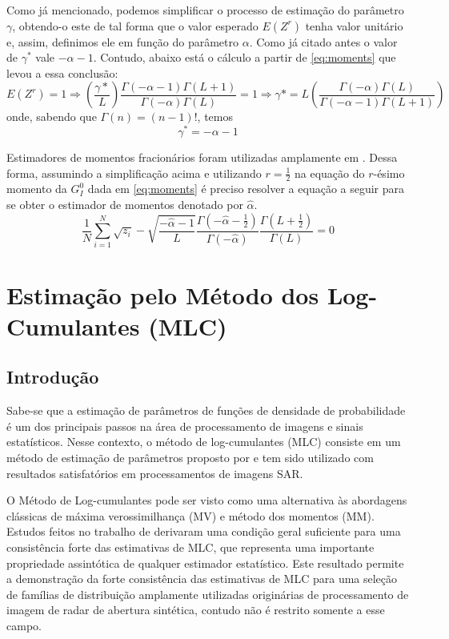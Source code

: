 Como já mencionado, podemos simplificar o processo de estimação do parâmetro $\gamma$, obtendo-o este de tal forma que o valor esperado $E(Z^r)$ tenha valor unitário e, assim, definimos ele em função do parâmetro $\alpha$. Como já citado antes o valor de $\gamma^{*}$ vale $-\alpha - 1$. Contudo, abaixo está o cálculo a partir de \eqref{eq:moments} que levou a essa conclusão:
\begin{equation}
    E(Z^r) = 1 \Rightarrow \left (\frac{\gamma*}{L}\right ) \frac{\Gamma(-\alpha-1)\Gamma(L+1)}{\Gamma(-\alpha)\Gamma(L)} = 1 \Rightarrow \gamma* = L\left ( \frac{\Gamma(-\alpha)\Gamma(L)}{\Gamma(-\alpha-1)\Gamma(L+1)} \right ) 
\end{equation}
onde, sabendo que $\Gamma(n) = (n-1)!$, temos
\begin{equation}
    \gamma^{*} = -\alpha - 1
\end{equation}

Estimadores de momentos fracionários foram utilizadas amplamente em \citet{Clutter1997}. Dessa forma, assumindo a simplificação acima e utilizando $r=\frac{1}{2}$ na equação do $r$-ésimo momento da $G_I^0$ dada em \eqref{eq:moments} é preciso resolver a equação a seguir para se obter o estimador de momentos denotado por $\widehat{\alpha}$.
\begin{equation}
    \frac{1}{N}\sum_{i=1}^{N}\sqrt{z_i}-\sqrt{\frac{-\widehat{\alpha} - 1}{L}}\frac{\Gamma(-\widehat{\alpha} - \frac{1}{2})}{\Gamma(-\widehat{\alpha})}\frac{\Gamma(L+\frac{1}{2})}{\Gamma(L)} = 0 \label{fractional_moments}
\end{equation} 

\section{Estimação pelo Método dos Log-Cumulantes (MLC)}

\subsection{Introdução}

Sabe-se que a estimação de parâmetros de funções de densidade de probabilidade é um dos principais passos na área de processamento de imagens e sinais estatísticos. Nesse contexto, o método de log-cumulantes (MLC) consiste em um método de estimação de parâmetros proposto por \citet{nicolas2002} e tem sido utilizado com resultados satisfatórios em processamentos de imagens SAR.

O Método de Log-cumulantes pode ser visto como uma alternativa às abordagens clássicas de máxima verossimilhança (MV) e método dos momentos (MM). Estudos feitos no trabalho de \citet{krylov2013} derivaram uma condição geral suficiente para uma consistência forte das estimativas de MLC, que representa uma importante propriedade assintótica de qualquer estimador estatístico. Este resultado permite a demonstração da forte consistência das estimativas de MLC para uma seleção de famílias de distribuição amplamente utilizadas originárias de processamento de imagem de radar de abertura sintética, contudo não é restrito somente a esse campo. 

